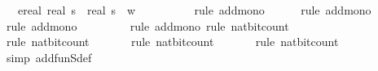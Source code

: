 \begin{isabellebody}
\ \ \ {\isacharparenleft}{\kern0pt}ereal\ {\isacharparenleft}{\kern0pt}real\ s\ {\isacharasterisk}{\kern0pt}\ real\ s\ {\isacharasterisk}{\kern0pt}\ {\isacharparenleft}{\kern0pt}w\ {\isacharplus}{\kern0pt}\ {}{\isacharparenright}{\kern0pt}\ {\isacharplus}{\kern0pt}\ {}{\isacharparenright}{\kern0pt}{\isachardoublequoteclose}\isanewline
\ \ \ \ \isamarkupfalse%
\ {\isacharparenleft}{\kern0pt}rule\ add{\isacharunderscore}{\kern0pt}mono{\isacharparenright}{\kern0pt}\isanewline
\ \ \ \ \isamarkupfalse%
\ {\isacharparenleft}{\kern0pt}rule\ add{\isacharunderscore}{\kern0pt}mono{\isacharparenright}{\kern0pt}\isanewline
\ \ \ \ \isamarkupfalse%
\ {\isacharparenleft}{\kern0pt}rule\ add{\isacharunderscore}{\kern0pt}mono{\isacharparenright}{\kern0pt}\isanewline
\ \ \ \ \ \ \ \isamarkupfalse%
\ {\isacharparenleft}{\kern0pt}rule\ add{\isacharunderscore}{\kern0pt}mono{\isacharcomma}{\kern0pt}\ rule\ nat{\isacharunderscore}{\kern0pt}bit{\isacharunderscore}{\kern0pt}count{\isacharparenright}{\kern0pt}\isanewline
\ \ \ \ \ \ \isamarkupfalse%
\ {\isacharparenleft}{\kern0pt}rule\ nat{\isacharunderscore}{\kern0pt}bit{\isacharunderscore}{\kern0pt}count{\isacharparenright}{\kern0pt}\isanewline
\ \ \ \ \ \isamarkupfalse%
\ {\isacharparenleft}{\kern0pt}rule\ nat{\isacharunderscore}{\kern0pt}bit{\isacharunderscore}{\kern0pt}count{\isacharparenright}{\kern0pt}\isanewline
\ \ \ \ \ \isamarkupfalse%
\ {\isacharparenleft}{\kern0pt}rule\ nat{\isacharunderscore}{\kern0pt}bit{\isacharunderscore}{\kern0pt}count{\isacharparenright}{\kern0pt}\isanewline
\ \ \ \ \isamarkupfalse%
\ {\isacharparenleft}{\kern0pt}simp\ add{\isacharcolon}{\kern0pt}fun\isactrlsub S{\isacharunderscore}{\kern0pt}def{\isacharparenright}{\kern0pt}\isanewline
\ \ \ \ \isamarkupfalse%

\end{isabellebody}
